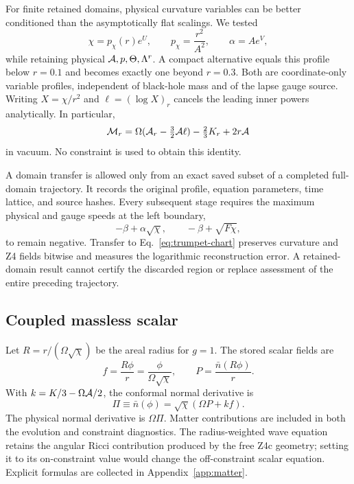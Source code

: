 For finite retained domains, physical curvature variables can be better conditioned than the asymptotically flat scalings. We tested
\begin{equation}
 \chi=p_\chi(r)e^U,\qquad p_\chi=\frac{r^2}{A^2},\qquad
 \alpha=Ae^V,
\label{eq:trumpet-chart}
\end{equation}
while retaining physical $\mathcal A,p,\Theta,\Lambda^r$. A compact alternative equals this profile below $r=0.1$ and becomes exactly one beyond $r=0.3$. Both are coordinate-only variable profiles, independent of black-hole mass and of the lapse gauge source. Writing $X=\chi/r^2$ and $\ell=(\log X)_r$ cancels the leading inner powers analytically. In particular,
\begin{equation}
 \mathcal M_r=\Omega(\mathcal A_r-\tfrac32\mathcal A\ell)-\tfrac23K_r+2r\mathcal A
\end{equation}
in vacuum. No constraint is used to obtain this identity.

A domain transfer is allowed only from an exact saved subset of a completed full-domain trajectory. It records the original profile, equation parameters, time lattice, and source hashes. Every subsequent stage requires the maximum physical and gauge speeds at the left boundary,
\begin{equation}
 -\beta+\alpha\sqrt\chi,\qquad -\beta+\sqrt{F\chi},
\end{equation}
to remain negative. Transfer to Eq.~\eqref{eq:trumpet-chart} preserves curvature and Z4 fields bitwise and measures the logarithmic reconstruction error. A retained-domain result cannot certify the discarded region or replace assessment of the entire preceding trajectory.

\subsection{Coupled massless scalar}
Let $R=r/(\Omega\sqrt\chi)$ be the areal radius for $g=1$. The stored scalar fields are
\begin{equation}
 f=\frac{R\phi}{r}=\frac{\phi}{\Omega\sqrt\chi},\qquad
 P=\frac{\bar n(R\phi)}{r}.
\end{equation}
With $k=K/3-\Omega\mathcal A/2$, the conformal normal derivative is
\begin{equation}
 \Pi\equiv\bar n(\phi)=\sqrt\chi(\Omega P+kf).
\end{equation}
The physical normal derivative is $\Omega\Pi$. Matter contributions are included in both the evolution and constraint diagnostics. The radius-weighted wave equation retains the angular Ricci contribution produced by the free Z4c geometry; setting it to its on-constraint value would change the off-constraint scalar equation. Explicit formulas are collected in Appendix~\ref{app:matter}.


